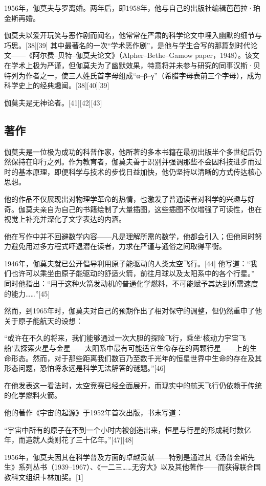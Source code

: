 1956年，伽莫夫与罗离婚。两年后，即1958年，他与自己的出版社编辑芭芭拉·珀金斯再婚。

伽莫夫以爱开玩笑与恶作剧而闻名，他常常在严肃的科学论文中埋入幽默的细节与巧思。[38][39] 其中最著名的一次“学术恶作剧”，是他与学生合写的那篇划时代论文——《阿尔费–贝特–伽莫夫论文》（Alpher–Bethe–Gamow paper，1948）。该文在学术上极为严谨，但伽莫夫为了幽默效果，特意将并未参与研究的同事汉斯·贝特列为作者之一，使三人姓氏首字母组成“α–β–γ”（希腊字母表前三个字母），成为科学史上的经典趣闻。[38][40][39]

伽莫夫是无神论者。[41][42][43]
\subsection{著作}
伽莫夫是一位极为成功的科普作家，他所著的多本书籍在最初出版半个多世纪后仍然保持在印行之列。作为教育者，伽莫夫善于识别并强调那些不会因科技进步而过时的基本原理，即便科学与技术的步伐日益加快，他仍坚持以清晰的方式传达核心思想。

他的作品不仅展现出对物理学革命的热情，也激发了普通读者对科学的兴趣与好奇。伽莫夫亲自为自己的书籍绘制了大量插图，这些插图不仅增强了可读性，也在视觉上补充并深化了文字表达的内涵。

他在写作中并不回避数学内容——凡是理解所需的数学，他都会引入；但他同时努力避免用过多方程式吓退潜在读者，力求在严谨与通俗之间取得平衡。

1946年，伽莫夫就已公开倡导利用原子能驱动的人类太空飞行。[44]
他写道：“我们也许可以乘坐由原子能驱动的舒适火箭，前往月球以及太阳系中的各个行星。”
同时他指出：“用于这种火箭发动机的普通化学燃料，不可能赋予其达到所需速度的能力……”[45]

然而，到1965年时，伽莫夫对自己的预期作出了相对保守的调整，但仍然重申了他关于原子能航天的设想：

“或许在不久的将来，我们能够通过一次大胆的探险飞行，乘坐‘核动力宇宙飞船’去探索火星与金星——太阳系中最有可能适宜生命存在的两颗行星——上的生命形态。然而，对于那些距离我们数百乃至数千光年的恒星世界中生命的存在及其形态问题，恐怕将永远是科学无法解答的谜题。”[46]

在他发表这一看法时，太空竞赛已经全面展开，而现实中的航天飞行仍依赖于传统的化学燃料火箭。

他的著作《宇宙的起源》于1952年首次出版，书末写道：

“宇宙中所有的原子在不到一个小时内被创造出来，恒星与行星的形成耗时数亿年，而造就人类则花了三十亿年。”[47][48]

1956年，伽莫夫因其在科学普及方面的卓越贡献——特别是通过其《汤普金斯先生》系列丛书（1939–1967）、《一二三……无穷大》以及其他著作——而获得联合国教科文组织卡林加奖。[1]

